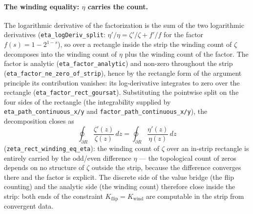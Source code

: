 \documentclass{article}
\newcommand{\zt}{\zeta}
\begin{document}
\paragraph{The winding equality: $\eta$ carries the count.}
The logarithmic derivative of the factorization is the sum of the
two logarithmic derivatives
(\texttt{eta\_logDeriv\_split}: $\eta'/\eta=\zt'/\zt+f'/f$ for the
factor $f(s)=1-2^{1-s}$), so over a rectangle inside the strip the
winding count of $\zt$ decomposes into the winding count of $\eta$
plus the winding count of the factor. The factor is analytic
(\texttt{eta\_factor\_analytic}) and non-zero throughout the strip
(\texttt{eta\_factor\_ne\_zero\_of\_strip}), hence by the rectangle
form of the argument principle its contribution vanishes: its
log-derivative integrates to zero over the rectangle
(\texttt{eta\_factor\_rect\_goursat}). Substituting the pointwise
split on the four sides of the rectangle (the integrability supplied
by \texttt{eta\_path\_continuous\_x/y} and
\texttt{factor\_path\_continuous\_x/y}), the decomposition closes as
\begin{equation}
  \oint_{\partial R}\frac{\zt'(z)}{\zt(z)}\,dz
  =\oint_{\partial R}\frac{\eta'(z)}{\eta(z)}\,dz
\end{equation}
(\texttt{zeta\_rect\_winding\_eq\_eta}): the winding count of $\zt$
over an in-strip rectangle is entirely carried by the odd/even
difference $\eta$ --- the topological count of zeros depends on no
structure of $\zt$ outside the strip, because the difference
converges there and the factor is explicit. The discrete side of the
value bridge (the flip counting) and the analytic side (the winding
count) therefore close inside the strip: both ends of the constraint
$K_{\mathrm{flip}}=K_{\mathrm{wind}}$ are computable in the strip
from convergent data.
\end{document}
